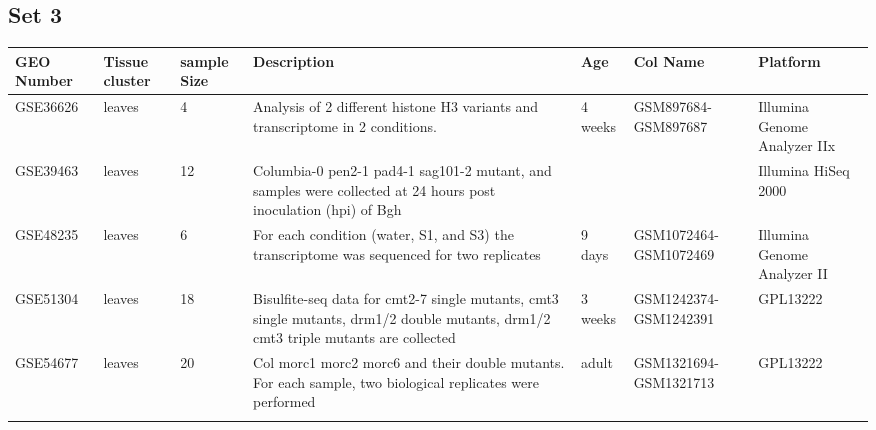 \documentclass[11pt, a4paper]{article}
\begin{document}
\begin{landscape}
\subsection{Set 3}
\begin{table}
\footnotesize
\centering
\begin{tabular}{p{2cm}p{3cm}p{1cm}p{4cm}p{2.4cm}p{3cm}p{4cm}} \hline
GEO Number &Tissue cluster & sample Size & Description & Age  &Col Name & Platform\\ \hline
GSE36626 &leaves & 4 &Analysis of 2 different histone H3 variants and transcriptome in 2 conditions.  & 4 weeks &GSM897684-GSM897687 & Illumina Genome Analyzer IIx \\ \hdashline
GSE39463 &leaves  &12		&Columbia-0 pen2-1 pad4-1 sag101-2 mutant, and samples were collected at 24 hours post inoculation (hpi) of Bgh & & &Illumina HiSeq 2000 \\ \hdashline
GSE48235 &leaves & 6  & For each condition (water, S1, and S3) the transcriptome was sequenced for two replicates & 9 days & GSM1072464-GSM1072469  &Illumina Genome Analyzer II \\	\hdashline
GSE51304 &leaves  & 18 &Bisulfite-seq data for cmt2-7 single mutants, cmt3 single mutants, drm1/2 double mutants, drm1/2 cmt3 triple mutants are collected  & 3 weeks & GSM1242374-GSM1242391 &GPL13222 \\ \hdashline
GSE54677 & leaves   &20  &Col morc1 morc2 morc6 and their double mutants. For each sample, two biological replicates were performed &adult & GSM1321694-GSM1321713	 &	GPL13222\\ \hdashline
\end{tabular} 
\end{table}
\end{landscape}

%
\end{document}
